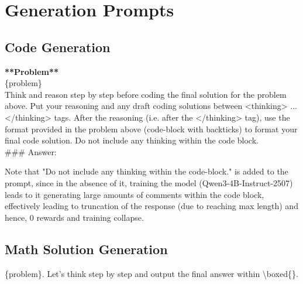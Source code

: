 \clearpage
\section{Generation Prompts}
\label{sec:generation_prompts}


\subsection{Code Generation}

\begin{tcolorbox}[
    colback=promptbg,
    colframe=promptborder,
    title={\textbf{Code Generation Prompt}},
    coltitle=white,
    fonttitle=\small\bfseries,
    breakable,
    enhanced
]
\small
\ttfamily
\textbf{**Problem**}\\
\{problem\}\\[0.75em]

Think and reason step by step before coding the final solution for the problem above.
Put your reasoning and any draft coding solutions between <thinking> ... </thinking> tags.
After the reasoning (i.e. after the </thinking> tag), use the format provided in the problem above
(code-block with backticks) to format your final code solution. Do not include any thinking within the code block.\\[0.75em]

\#\#\# Answer:
\end{tcolorbox}

Note that "Do not include any thinking within the code-block." is added to the prompt, since in the absence of it, training the model
(Qwen3-4B-Instruct-2507) leads to it generating large amounts of comments within the code block, effectively leading to truncation of the response (due to reaching max length) and hence, 0 rewards and training collapse.

\subsection{Math Solution Generation}

\begin{tcolorbox}[
    colback=promptbg,
    colframe=promptborder,
    title={\textbf{Math Solution Generation Prompt}},
    coltitle=white,
    fonttitle=\small\bfseries,
    breakable,
    enhanced
]
\small
\ttfamily
\{problem\}. Let's think step by step and output the final answer within \textbackslash boxed\{\}.
\end{tcolorbox}


